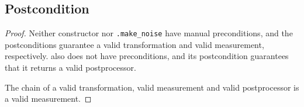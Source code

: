 \documentclass{article}
\begin{document}
\subsection*{Postcondition}
\begin{theorem}
\end{theorem}

\begin{proof}
    Neither constructor  nor
    \texttt{.make\_noise} have manual preconditions,
    and the postconditions guarantee a valid transformation and valid measurement, respectively.
     also does not have preconditions,
    and its postcondition guarantees that it returns a valid postprocessor.

    The chain of a valid transformation, valid measurement and valid postprocessor is a valid measurement.
\end{proof}
\end{document}
